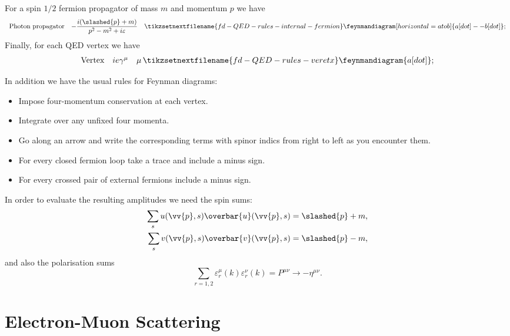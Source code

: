 \documentclass[fleqn]{NotesClass}
\newcommand{\minkowskiMetric}{\eta}
\newcommand{\diracadjoint}[1]{\overbar{#1}}
\begin{document}
    For a spin \(1/2\) fermion propagator of mass \(m\) and momentum \(p\) we have
    \begin{equation}
        \begin{array}{rrr}
            \text{Photon propagator} & \displaystyle-\frac{i(\slashed{p} + m)}{p^2 - m^2 + i\varepsilon} & \tikzsetnextfilename{fd-QED-rules-internal-fermion}\feynmandiagram[horizontal=a to b]{a [dot] -- b [dot]};
        \end{array}
    \end{equation}
    Finally, for each QED vertex we have
    \begin{equation}
        \begin{array}{rrr}
            \text{Vertex} & ie\gamma^\mu & \mu \, \tikzsetnextfilename{fd-QED-rules-veretx}\feynmandiagram{a [dot]};
        \end{array}
    \end{equation}
    
    In addition we have the usual rules for Feynman diagrams:
    \begin{itemize}
        \item Impose four-momentum conservation at each vertex.
        \item Integrate over any unfixed four momenta.
        \item Go along an arrow and write the corresponding terms with spinor indics from right to left as you encounter them.
        \item For every closed fermion loop take a trace and include a minus sign.
        \item For every crossed pair of external fermions include a minus sign.
    \end{itemize}
    
    In order to evaluate the resulting amplitudes we need the spin sums:
    \begin{align}
        \sum_s u(\vv{p}, s) \diracadjoint{u}(\vv{p}, s) &= \slashed{p} + m,\\
        \sum_s v(\vv{p}, s) \diracadjoint{v}(\vv{p}, s) &= \slashed{p} - m,
    \end{align}
    and also the polarisation sums
    \begin{equation}
        \sum_{r=1,2} \varepsilon^{\mu}_r(k) \varepsilon^\nu_r(k) = P^{\mu\nu} \to -\minkowskiMetric^{\mu\nu}.
    \end{equation}
    
    \chapter{Electron-Muon Scattering}
\end{document}
